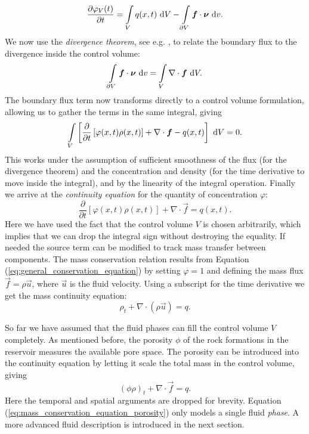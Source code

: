 \begin{equation} \label{eq:conservation_principle}
\frac{\partial \varphi_V(t)}{\partial t} = \int\limits_{V} q(x,t) \ \text{d}V - \int \limits_{\partial V} \boldsymbol{f} \cdot \boldsymbol{\nu} \ \text{d}v.
\end{equation}
We now use the \emph{divergence theorem}, see e.g. \citep[p.~68-69]{weber_essential_2003}, to relate the boundary flux to the divergence inside the control volume:
 \begin{equation} \label{eq:divergence_theorem}
 \int \limits_{\partial V} \boldsymbol{f} \cdot \boldsymbol{\nu} \ \text{d}v = \int \limits_{V} \nabla \cdot \boldsymbol{f} \ \text{d}V.
 \end{equation}
The boundary flux term now transforms directly to a control volume formulation, allowing us to gather the terms in the same integral, giving
\begin{equation*}
 \int \limits_{V} \left[ \frac{\partial{}}{\partial{t}} \left[ \varphi(x,t)\rho(x,t) \right] + \nabla \cdot \boldsymbol{f} - q(x,t) \right] \ \text{d}V = 0.
\end{equation*}
This works under the assumption of sufficient smoothness of the flux (for the divergence theorem) and the concentration and density (for the time derivative to move inside the integral), and by the linearity of the integral operation. Finally we arrive at the \emph{continuity equation} for the quantity of concentration $\varphi$:
\begin{equation} \label{eq:general_conservation_equation}
\frac{\partial{}}{\partial{t}} \left[ \varphi(x,t)\rho(x,t) \right] + \nabla \cdot \vec{f} = q(x,t).
\end{equation}
Here we have used the fact that the control volume $V$ is chosen arbitrarily, which implies that we can drop the integral sign without destroying the equality. If needed the source term can be modified to track mass transfer between components. The mass conservation relation results from Equation (\ref{eq:general_conservation_equation}) by setting $\varphi = 1$ and defining the mass flux $\vec{f} = \rho \vec{u}$, where $\vec{u}$ is the fluid velocity. Using a subscript for the time derivative we get the mass continuity equation:
\begin{equation} \label{eq:mass_conservation_equation}
\rho_t + \nabla \cdot \left( \rho \vec{u} \right) = q.
\end{equation}

So far we have assumed that the fluid phases can fill the control volume $V$ completely. As mentioned before, the porosity $\phi$ of the rock formations in the reservoir measures the available pore space. The porosity can be introduced into the continuity equation by letting it scale the total mass in the control volume, giving 
\begin{equation} \label{eq:mass_conservation_equation_porosity}
\left( \phi \rho \right)_t + \nabla \cdot \vec{f} = q.
\end{equation}
Here the temporal and spatial arguments are dropped for brevity. Equation (\ref{eq:mass_conservation_equation_porosity}) only models a single fluid \emph{phase}. A more advanced fluid description is introduced in the next section. 

